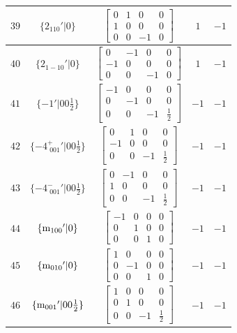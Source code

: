 \documentclass[fleqn,8pt]{jsarticle}
\begin{document}
\begin{longtable}{ccccc}
$ 39 $ & $ \{2{}_{110}{}'|0\} $ & $ \begin{bmatrix} 0 & 1 & 0 & 0 \\ 1 & 0 & 0 & 0 \\ 0 & 0 & -1 & 0 \end{bmatrix} $ & $ 1 $ & $ -1 $ \\ \hline
$ 40 $ & $ \{2{}_{1-10}{}'|0\} $ & $ \begin{bmatrix} 0 & -1 & 0 & 0 \\ -1 & 0 & 0 & 0 \\ 0 & 0 & -1 & 0 \end{bmatrix} $ & $ 1 $ & $ -1 $ \\ \hline
$ 41 $ & $ \{-1{}'|0 0 \frac{1}{2}\} $ & $ \begin{bmatrix} -1 & 0 & 0 & 0 \\ 0 & -1 & 0 & 0 \\ 0 & 0 & -1 & \frac{1}{2} \end{bmatrix} $ & $ -1 $ & $ -1 $ \\ \hline
$ 42 $ & $ \{-4^{+}_{\,\,001}{}'|0 0 \frac{1}{2}\} $ & $ \begin{bmatrix} 0 & 1 & 0 & 0 \\ -1 & 0 & 0 & 0 \\ 0 & 0 & -1 & \frac{1}{2} \end{bmatrix} $ & $ -1 $ & $ -1 $ \\ \hline
$ 43 $ & $ \{-4^{-}_{\,\,001}{}'|0 0 \frac{1}{2}\} $ & $ \begin{bmatrix} 0 & -1 & 0 & 0 \\ 1 & 0 & 0 & 0 \\ 0 & 0 & -1 & \frac{1}{2} \end{bmatrix} $ & $ -1 $ & $ -1 $ \\ \hline
$ 44 $ & $ \{{\rm m}_{100}{}'|0\} $ & $ \begin{bmatrix} -1 & 0 & 0 & 0 \\ 0 & 1 & 0 & 0 \\ 0 & 0 & 1 & 0 \end{bmatrix} $ & $ -1 $ & $ -1 $ \\ \hline
$ 45 $ & $ \{{\rm m}_{010}{}'|0\} $ & $ \begin{bmatrix} 1 & 0 & 0 & 0 \\ 0 & -1 & 0 & 0 \\ 0 & 0 & 1 & 0 \end{bmatrix} $ & $ -1 $ & $ -1 $ \\ \hline
$ 46 $ & $ \{{\rm m}_{001}{}'|0 0 \frac{1}{2}\} $ & $ \begin{bmatrix} 1 & 0 & 0 & 0 \\ 0 & 1 & 0 & 0 \\ 0 & 0 & -1 & \frac{1}{2} \end{bmatrix} $ & $ -1 $ & $ -1 $ \\ \hline

\end{longtable}
\end{document}

